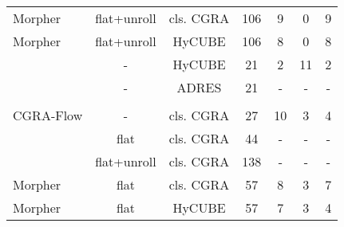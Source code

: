 \begin{table}
{\begin{tabular}{|l|c|c|c|c|c|c|}
 {Morpher}                                            & {flat+unroll}                        & cls. CGRA                            & 106                           & 9                          & 0                                   & 9 \\ 
 {Morpher}                                            & {flat+unroll}                        & HyCUBE                               & 106                           & 8                          & 0                                   & 8 \\ 
 \rowcolor{darkOrange!50}{CGRA-ME}                    & {-}                                  & HyCUBE                               & 21                            & 2                          & 11                                  & 2 \\
 \rowcolor{darkRed!50}{Pillars}                       & {-}                                  & ADRES                                & 21                            & -                          & -                                   & - \\\hline\hline
 \rowcolor{darkGray} \multicolumn{7}{|c|}{\color{white}{\textbf{TRISOLV}}} \\\hline
 {CGRA-Flow}                                          & -                                    & cls. CGRA                            & 27                            & 10                         & 3                                   & 4\\ 
 \rowcolor{darkRed!50}{CGRA-Flow}                     & flat                                 & cls. CGRA                            & 44                            & -                          & -                                   & -\\ 
 \rowcolor{darkRed!50}{CGRA-Flow}                     & flat+unroll                          & cls. CGRA                            & 138                           & -                          & -                                   & -\\ 
 {Morpher}                                            & {flat}                               & cls. CGRA                            & 57                            & 8                          & 3                                   & 7 \\ 
 {Morpher}                                            & {flat}                               & HyCUBE                               & 57                            & 7                          & 3                                   & 4 \\

\end{tabular}}
\end{table}
